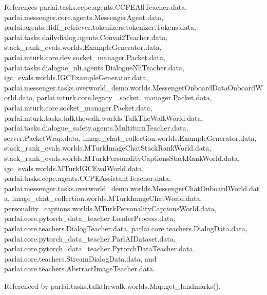 References parlai.\+tasks.\+ccpe.\+agents.\+C\+C\+P\+E\+All\+Teacher.\+data, parlai.\+messenger.\+core.\+agents.\+Messenger\+Agent.\+data, parlai.\+agents.\+tfidf\+\_\+retriever.\+tokenizers.\+tokenizer.\+Tokens.\+data, parlai.\+tasks.\+dailydialog.\+agents.\+Convai2\+Teacher.\+data, stack\+\_\+rank\+\_\+evals.\+worlds.\+Example\+Generator.\+data, parlai.\+mturk.\+core.\+dev.\+socket\+\_\+manager.\+Packet.\+data, parlai.\+tasks.\+dialogue\+\_\+nli.\+agents.\+Dialogue\+Nli\+Teacher.\+data, igc\+\_\+evals.\+worlds.\+I\+G\+C\+Example\+Generator.\+data, parlai.\+messenger.\+tasks.\+overworld\+\_\+demo.\+worlds.\+Messenger\+Onboard\+Data\+Onboard\+World.\+data, parlai.\+mturk.\+core.\+legacy\+\_.\+socket\+\_\+manager.\+Packet.\+data, parlai.\+mturk.\+core.\+socket\+\_\+manager.\+Packet.\+data, parlai.\+mturk.\+tasks.\+talkthewalk.\+worlds.\+Talk\+The\+Walk\+World.\+data, parlai.\+tasks.\+dialogue\+\_\+safety.\+agents.\+Multiturn\+Teacher.\+data, server.\+Packet\+Wrap.\+data, image\+\_\+chat\+\_\+collection.\+worlds.\+Example\+Generator.\+data, stack\+\_\+rank\+\_\+evals.\+worlds.\+M\+Turk\+Image\+Chat\+Stack\+Rank\+World.\+data, stack\+\_\+rank\+\_\+evals.\+worlds.\+M\+Turk\+Personality\+Captions\+Stack\+Rank\+World.\+data, igc\+\_\+evals.\+worlds.\+M\+Turk\+I\+G\+C\+Eval\+World.\+data, parlai.\+tasks.\+ccpe.\+agents.\+C\+C\+P\+E\+Assistant\+Teacher.\+data, parlai.\+messenger.\+tasks.\+overworld\+\_\+demo.\+worlds.\+Messenger\+Chat\+Onboard\+World.\+data, image\+\_\+chat\+\_\+collection.\+worlds.\+M\+Turk\+Image\+Chat\+World.\+data, personality\+\_\+captions.\+worlds.\+M\+Turk\+Personality\+Captions\+World.\+data, parlai.\+core.\+pytorch\+\_\+data\+\_\+teacher.\+Loader\+Process.\+data, parlai.\+core.\+teachers.\+Dialog\+Teacher.\+data, parlai.\+core.\+teachers.\+Dialog\+Data.\+data, parlai.\+core.\+pytorch\+\_\+data\+\_\+teacher.\+Parl\+A\+I\+Dataset.\+data, parlai.\+core.\+pytorch\+\_\+data\+\_\+teacher.\+Pytorch\+Data\+Teacher.\+data, parlai.\+core.\+teachers.\+Stream\+Dialog\+Data.\+data, and parlai.\+core.\+teachers.\+Abstract\+Image\+Teacher.\+data.



Referenced by parlai.\+tasks.\+talkthewalk.\+worlds.\+Map.\+get\+\_\+landmarks().

